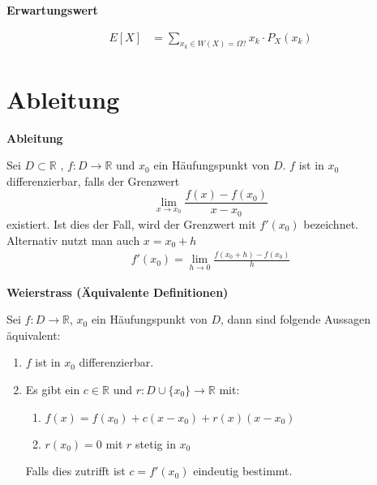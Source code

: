 \documentclass[25pt]{sciposter}
\newcommand{\R}{\mathbb{R}}
\newenvironment{method}[1]{\begin{mdframed}[backgroundcolor=blue!10,innertopmargin=15pt, innerbottommargin=15pt]
		\textbf{#1 }
	}
	{ 
	\end{mdframed}
}
\begin{document}
\begin{multicols}{3}
\begin{method}{Erwartungswert}
	\begin{align*}
		E[X] &= \sum_{x_k \in W(X) = \Omega?} x_k \cdot P_X(x_k)
	\end{align*}
\end{method}











\newpage













\section{Ableitung}

\begin{method}{Ableitung}
	Sei $D \subset \R$ , $f:D \to  \R$ und $x_0$ ein Häufungspunkt von $D$. $f$ ist in $x_0$ differenzierbar, falls der Grenzwert 
	$$ \lim\limits_{x \to x_0} \frac{f(x) -f(x_0)}{x-x_0}$$
	existiert. Ist dies der Fall, wird der Grenzwert mit $f'(x_0)$ bezeichnet.\\
	Alternativ nutzt man auch $x = x_0 + h$
	\begin{align*}
			f'(x_0) = \lim\limits_{h \to 0} \frac{f(x_0 + h) - f(x_0)}{h}
	\end{align*}
\end{method}


\begin{method}{Weierstrass (Äquivalente Definitionen)}
Sei $f : D \to \R$, $x_0$ ein Häufungspunkt von $D$, dann sind folgende Aussagen äquivalent:
\begin{enumerate}
	\item $f$ ist in $x_0$ differenzierbar.
	\item Es gibt ein $c\in \R$ und $r : D \cup \{x_0\} \to \R$ mit:
	\begin{enumerate}
		\item $f(x) = f(x_0) + c(x-x_0) + r(x) (x-x_0)$
		\item $r(x_0) = 0$ mit $r$ stetig in $x_0$
	\end{enumerate}
Falls dies zutrifft ist $c=f'(x_0)$ eindeutig bestimmt.
\end{enumerate}
\end{method}


\end{multicols}
\end{document}
